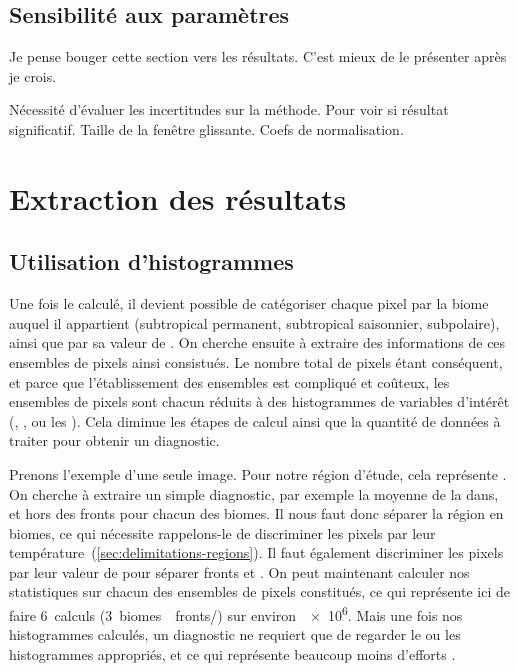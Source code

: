 \subsection{Sensibilité aux paramètres}
\label{sec:HI-sensibilite}

Je pense bouger cette section vers les résultats. C'est mieux de le présenter après je crois.

Nécessité d'évaluer les incertitudes sur la méthode.
Pour voir si résultat significatif.
Taille de la fenêtre glissante. Coefs de normalisation.


\section{Extraction des résultats}
\label{sec:extraction-res}

\subsection{Utilisation d'histogrammes}
\label{sec:extraction-hist}

Une fois le  calculé, il devient possible de catégoriser chaque pixel par la biome auquel il appartient (subtropical permanent, subtropical saisonnier, subpolaire), ainsi que par sa valeur de .
On cherche ensuite à extraire des informations de ces ensembles de pixels ainsi consistués.
Le nombre total de pixels étant conséquent, et parce que l'établissement des ensembles est compliqué et coûteux, les ensembles de pixels sont chacun réduits à des histogrammes de variables d'intérêt (, , ou les ).
Cela diminue les étapes de calcul ainsi que la quantité de données à traiter pour obtenir un diagnostic.

Prenons l'exemple d'une seule image. Pour notre région d'étude, cela représente .
On cherche à extraire un simple diagnostic, par exemple la moyenne de la  dans, et hors des fronts pour chacun des biomes.
Il nous faut donc séparer la région en biomes, ce qui nécessite rappelons-le de discriminer les pixels par leur température~(\cref{sec:delimitations-regions}).
Il faut également discriminer les pixels par leur valeur de  pour séparer fronts et .
On peut maintenant calculer nos statistiques sur chacun des ensembles de pixels constitués, ce qui représente ici de faire 6~calculs (3~biomes~\texttimes\ fronts/) sur environ~\qty{e6}{\pixels}.
Mais une fois nos histogrammes calculés, un diagnostic ne requiert que de regarder le ou les histogrammes appropriés, et ce qui représente beaucoup moins d'efforts .

